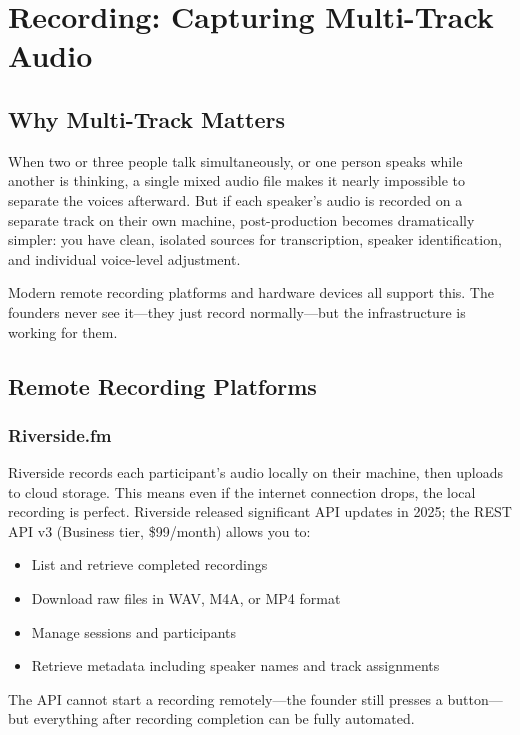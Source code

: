 \documentclass[11pt,letterpaper]{article}
\begin{document}
\vspace{12pt}

\section{Recording: Capturing Multi-Track Audio}

\subsection{Why Multi-Track Matters}

When two or three people talk simultaneously, or one person speaks while another is thinking, a single mixed audio file makes it nearly impossible to separate the voices afterward. But if each speaker's audio is recorded on a separate track on their own machine, post-production becomes dramatically simpler: you have clean, isolated sources for transcription, speaker identification, and individual voice-level adjustment.

Modern remote recording platforms and hardware devices all support this. The founders never see it—they just record normally—but the infrastructure is working for them.

\subsection{Remote Recording Platforms}

\subsubsection{Riverside.fm}

Riverside records each participant's audio locally on their machine, then uploads to cloud storage. This means even if the internet connection drops, the local recording is perfect. Riverside released significant API updates in 2025; the REST API v3 (Business tier, \$99/month) allows you to:

\begin{itemize}
  \item List and retrieve completed recordings
  \item Download raw files in WAV, M4A, or MP4 format
  \item Manage sessions and participants
  \item Retrieve metadata including speaker names and track assignments
\end{itemize}

The API cannot start a recording remotely—the founder still presses a button—but everything after recording completion can be fully automated.
\end{document}
